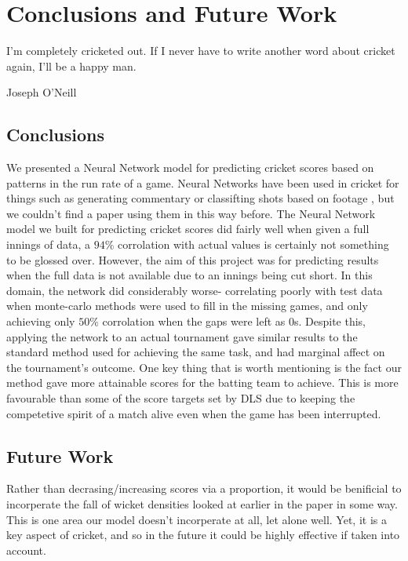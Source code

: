 \chapter{Conclusions and Future Work}

\epigraph{I'm completely cricketed out. If I never have to write another word about cricket again, I'll be a happy man.}{Joseph O'Neill}

\section{Conclusions}
We presented a Neural Network model for predicting cricket scores based on patterns in the run rate of a game. Neural Networks have been used in cricket for things such as 
generating commentary \cite{kumar2} or classifting shots based on footage \cite{foysal}, but we couldn't find a paper using them in this way before. 
The Neural Network model we built for predicting cricket scores did fairly well when given a full innings of data, a $94\%$ corrolation with actual values is certainly not 
something to be glossed over. However, the aim of this project was for predicting results when the full data is not available due to an innings being cut short. 
In this domain, the network did considerably worse- correlating poorly with test data when monte-carlo methods were used to fill in the missing games, and only achieving only $50\%$ 
corrolation when the gaps were left as 0s. Despite this, applying the network to an actual tournament gave similar results to the standard method used for achieving the same task, and had 
marginal affect on the tournament's outcome. One key thing that is worth mentioning is the fact our method gave more attainable scores for the batting team to achieve. This is more favourable than some of the score targets 
set by DLS due to keeping the competetive spirit of a match alive even when the game has been interrupted. 


\section{Future Work}
Rather than decrasing/increasing scores via a proportion, it would be benificial to incorperate the fall of wicket densities looked at earlier in the paper in some way. This is one 
area our model doesn't incorperate at all, let alone well. Yet, it is a key aspect of cricket, and so in the future it could be highly effective if taken into account. \\


